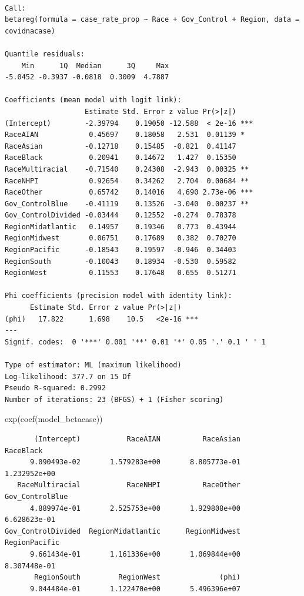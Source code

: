 \documentclass[
  letterpaper,
  DIV=11,
  numbers=noendperiod]{scrartcl}
\newenvironment{Shaded}{\begin{snugshade}}{\end{snugshade}}
\newcommand{\FunctionTok}[1]{\textcolor[rgb]{0.28,0.35,0.67}{#1}}
\newcommand{\NormalTok}[1]{\textcolor[rgb]{0.00,0.23,0.31}{#1}}
\begin{document}
\begin{verbatim}

Call:
betareg(formula = case_rate_prop ~ Race + Gov_Control + Region, data = covidnacase)

Quantile residuals:
    Min      1Q  Median      3Q     Max 
-5.0452 -0.3937 -0.0818  0.3009  4.7887 

Coefficients (mean model with logit link):
                   Estimate Std. Error z value Pr(>|z|)    
(Intercept)        -2.39794    0.19050 -12.588  < 2e-16 ***
RaceAIAN            0.45697    0.18058   2.531  0.01139 *  
RaceAsian          -0.12718    0.15485  -0.821  0.41147    
RaceBlack           0.20941    0.14672   1.427  0.15350    
RaceMultiracial    -0.71540    0.24308  -2.943  0.00325 ** 
RaceNHPI            0.92654    0.34262   2.704  0.00684 ** 
RaceOther           0.65742    0.14016   4.690 2.73e-06 ***
Gov_ControlBlue    -0.41119    0.13526  -3.040  0.00237 ** 
Gov_ControlDivided -0.03444    0.12552  -0.274  0.78378    
RegionMidatlantic   0.14957    0.19346   0.773  0.43944    
RegionMidwest       0.06751    0.17689   0.382  0.70270    
RegionPacific      -0.18543    0.19597  -0.946  0.34403    
RegionSouth        -0.10043    0.18934  -0.530  0.59582    
RegionWest          0.11553    0.17648   0.655  0.51271    

Phi coefficients (precision model with identity link):
      Estimate Std. Error z value Pr(>|z|)    
(phi)   17.822      1.698    10.5   <2e-16 ***
---
Signif. codes:  0 '***' 0.001 '**' 0.01 '*' 0.05 '.' 0.1 ' ' 1 

Type of estimator: ML (maximum likelihood)
Log-likelihood: 377.7 on 15 Df
Pseudo R-squared: 0.2992
Number of iterations: 23 (BFGS) + 1 (Fisher scoring) 
\end{verbatim}

\begin{Shaded}
\begin{Highlighting}[]
\FunctionTok{exp}\NormalTok{(}\FunctionTok{coef}\NormalTok{(model\_betacase))}
\end{Highlighting}
\end{Shaded}

\begin{verbatim}
       (Intercept)           RaceAIAN          RaceAsian          RaceBlack 
      9.090493e-02       1.579283e+00       8.805773e-01       1.232952e+00 
   RaceMultiracial           RaceNHPI          RaceOther    Gov_ControlBlue 
      4.889974e-01       2.525753e+00       1.929808e+00       6.628623e-01 
Gov_ControlDivided  RegionMidatlantic      RegionMidwest      RegionPacific 
      9.661434e-01       1.161336e+00       1.069844e+00       8.307448e-01 
       RegionSouth         RegionWest              (phi) 
      9.044484e-01       1.122470e+00       5.496396e+07 
\end{verbatim}
\end{document}

